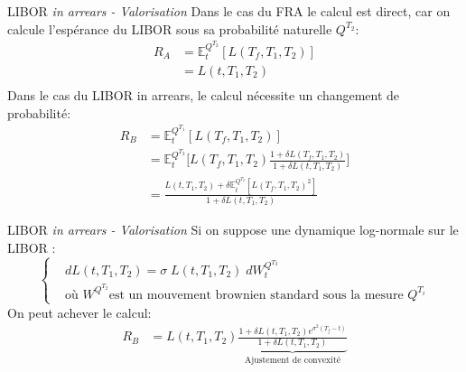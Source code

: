 \documentclass{beamer}
\begin{document}
\begin{frame}{LIBOR \it{in arrears \textnormal{- Valorisation}}}
Dans le cas du FRA le calcul est direct, car on calcule l'espérance du LIBOR sous sa probabilité naturelle $Q^{T_2}$:\\
\[
\begin{split}
R_A&=\mathbb{E}_t^{Q^{T_2}}[L(T_f,T_1,T_2)]\\
&=L(t,T_1,T_2)\\
\end{split}
\]
Dans le cas du LIBOR in arrears, le calcul nécessite un changement de probabilité:
\[
\begin{split}
R_B&=\mathbb{E}_t^{Q^{T_1}}[L(T_f,T_1,T_2)]\\
&=\mathbb{E}_t^{Q^{T_2}}\Big[L(T_f,T_1,T_2)\frac{1+\delta L(T_f,T_1,T_2)}{1+\delta L(t,T_1,T_2)}\Big]\\
&=\frac{L(t,T_1,T_2)+\delta \mathbb{E}_t^{Q^{T_2}}[L(T_f,T_1,T_2)^2]}{1+\delta L(t,T_1,T_2)}
\end{split}
\]
\end{frame}

\begin{frame}{LIBOR \it{in arrears} \textnormal{- Valorisation}}
Si on suppose une dynamique log-normale sur le LIBOR :
\[
\left\{
\begin{split}
&dL(t,T_1,T_2)=\sigma\;L(t,T_1,T_2) \;dW_t^{Q^{T_2}}\\
&\text{où } W^{Q^{T_2}}\text{est un mouvement brownien standard sous la mesure }Q^{T_i}
\end{split}
\right.
\]
On peut achever le calcul:
\[
\begin{split}
R_B&=L(t,T_1,T_2)\underbrace{\frac{1+\delta L(t,T_1,T_2)e^{\sigma^2 (T_f-t)}}{1+\delta L(t,T_1,T_2)}}_{\text{Ajustement de convexité}}
\end{split}
\]
\end{frame}
\end{document}
